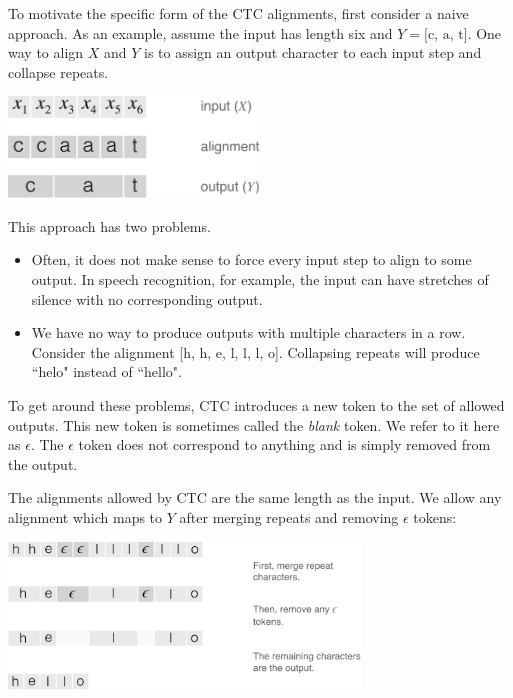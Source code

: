 To motivate the specific form of the CTC alignments, first consider a naive
approach. As an example, assume the input has length six and $Y = \textrm{[c,
a, t]}$. One way to align $X$ and $Y$ is to assign an output character to each
input step and collapse repeats.

\begin{center}
\includegraphics[width=0.5\textwidth]{background/figures/naive_alignment.pdf}
\end{center}

This approach has two problems.
\begin{itemize}
\item Often, it does not make sense to force every input step to align to some
output. In speech recognition, for example, the input can have stretches of
silence with no corresponding output.
\item We have no way to produce outputs with multiple characters in a row.
Consider the alignment [h, h, e, l, l, l, o]. Collapsing repeats will produce
``helo" instead of ``hello".
\end{itemize}

To get around these problems, CTC introduces a new token to the set of allowed
outputs. This new token is sometimes called the {\it blank} token. We refer to
it here as $\epsilon$. The $\epsilon$ token does not correspond to anything and
is simply removed from the output.

The alignments allowed by CTC are the same length as the input. We allow any
alignment which maps to $Y$ after merging repeats and removing $\epsilon$
tokens:

\begin{center}
\includegraphics[width=0.7\textwidth]{background/figures/alignment_steps.pdf}
\end{center}

